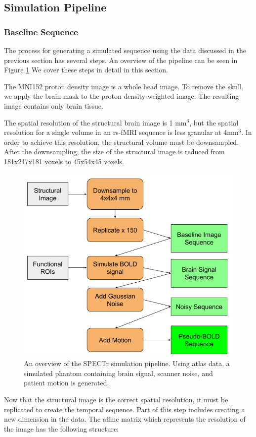 \subsection{Simulation Pipeline}

\subsubsection{Baseline Sequence}

The process for generating a simulated sequence using the data discussed in the previous section has several steps. An overview of the pipeline can be seen in Figure \ref{ch5:spectr_flow} We cover these steps in detail in this section.

The MNI152 proton density image is a whole head image. To remove the skull, we apply the brain mask to the proton density-weighted image. The resulting image contains only brain tissue.

The spatial resolution of the structural brain image is 1 mm$^3$, but the spatial resolution for a single volume in an rs-fMRI sequence is less granular at 4mm$^3$. In order to achieve this resolution, the structural volume must be downsampled. After the downsampling, the size of the structural image is reduced from 181x217x181 voxels to 45x54x45 voxels. 

\begin{figure}[t]
\centering
\includegraphics[width=.5\textwidth]{5/pipeline.png}
\caption{An overview of the SPECTr simulation pipeline. Using atlas data, a simulated phantom containing brain signal, scanner noise, and patient motion is generated.}
\label{ch5:spectr_flow}
\end{figure}


Now that the structural image is the correct spatial resolution, it must be replicated to create the temporal sequence. Part of this step includes creating a new dimension in the data. The affine matrix which represents the resolution of the image has the following structure:

